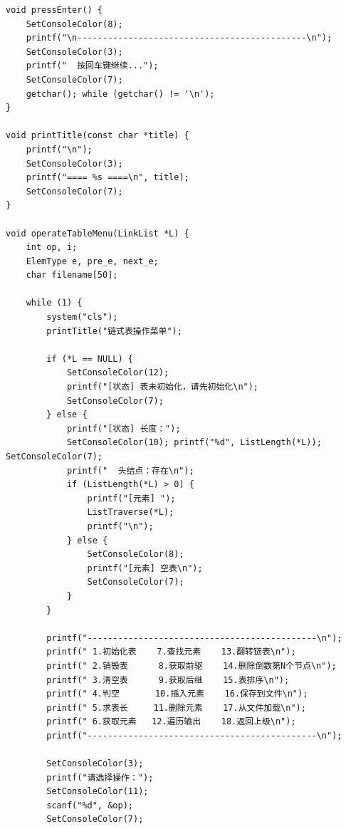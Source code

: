 \documentclass[supercite]{Experimental_Report}
\begin{document}
{\begin{lstlisting}
void pressEnter() {
    SetConsoleColor(8);
    printf("\n---------------------------------------------\n");
    SetConsoleColor(3);
    printf("  按回车键继续...");
    SetConsoleColor(7);
    getchar(); while (getchar() != '\n');
}

void printTitle(const char *title) {
    printf("\n");
    SetConsoleColor(3);
    printf("==== %s ====\n", title);
    SetConsoleColor(7);
}

void operateTableMenu(LinkList *L) {
    int op, i;
    ElemType e, pre_e, next_e;
    char filename[50];

    while (1) {
        system("cls");
        printTitle("链式表操作菜单");

        if (*L == NULL) {
            SetConsoleColor(12);
            printf("[状态] 表未初始化，请先初始化\n");
            SetConsoleColor(7);
        } else {
            printf("[状态] 长度：");
            SetConsoleColor(10); printf("%d", ListLength(*L)); SetConsoleColor(7);
            printf("  头结点：存在\n");
            if (ListLength(*L) > 0) {
                printf("[元素] ");
                ListTraverse(*L);
                printf("\n");
            } else {
                SetConsoleColor(8);
                printf("[元素] 空表\n");
                SetConsoleColor(7);
            }
        }

        printf("---------------------------------------------\n");
        printf(" 1.初始化表    7.查找元素    13.翻转链表\n");
        printf(" 2.销毁表      8.获取前驱    14.删除倒数第N个节点\n");
        printf(" 3.清空表      9.获取后继    15.表排序\n");
        printf(" 4.判空       10.插入元素    16.保存到文件\n");
        printf(" 5.求表长     11.删除元素    17.从文件加载\n");
        printf(" 6.获取元素   12.遍历输出    18.返回上级\n");
        printf("---------------------------------------------\n");

        SetConsoleColor(3);
        printf("请选择操作：");
        SetConsoleColor(11);
        scanf("%d", &op);
        SetConsoleColor(7);


\end{lstlisting}}
\end{document}
